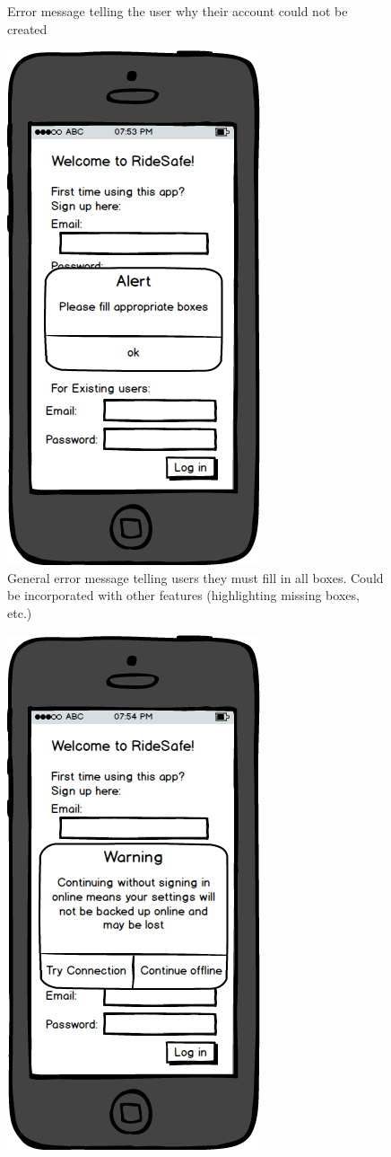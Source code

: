 \documentclass[a4paper]{report}
\begin{document}
{\begin{figure}
\caption{Error message telling the user why their account could not be created}
\end{figure}
\clearpage
\begin{figure}
\centering
\includegraphics[scale=0.9]{figures/prototype_2/missing_err}
\caption{General error message telling users they must fill in all boxes. Could be incorporated with other features (highlighting missing boxes, etc.)}
\end{figure}
\clearpage
\begin{figure}
\centering
\includegraphics[scale=0.9]{figures/prototype_2/offline_warn}

\end{figure}}
\end{document}
